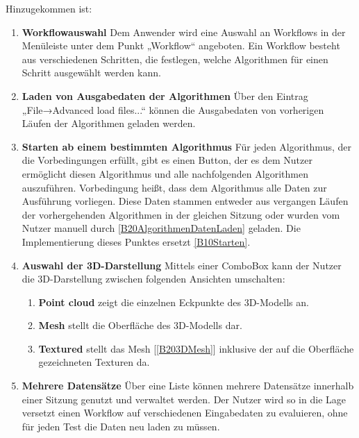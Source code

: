 Hinzugekommen ist:
\begin{enumerate}[ align=left, label={\textbf{\textbackslash B20\arabic*0\textbackslash}}]
	\item \textbf{Workflowauswahl} Dem Anwender wird eine Auswahl an Workflows in der Menüleiste unter dem Punkt „Workflow“ angeboten. Ein Workflow besteht aus verschiedenen Schritten, die festlegen, welche Algorithmen für einen Schritt ausgewählt werden kann.
	\item \textbf{Laden von Ausgabedaten der Algorithmen} \label{B20AlgorithmenDatenLaden} Über den Eintrag „File→Advanced load files...“ können die Ausgabedaten von vorherigen Läufen der Algorithmen geladen werden.
	\item \textbf{Starten ab einem bestimmten Algorithmus} Für jeden Algorithmus, der die Vorbedingungen erfüllt, gibt es einen Button, der es dem Nutzer ermöglicht diesen Algorithmus und alle nachfolgenden Algorithmen auszuführen. Vorbedingung heißt, dass dem Algorithmus alle Daten zur Ausführung vorliegen. Diese Daten stammen entweder aus vergangen Läufen der vorhergehenden Algorithmen in der gleichen Sitzung oder wurden vom Nutzer manuell durch \ref{B20AlgorithmenDatenLaden} geladen. Die Implementierung dieses Punktes ersetzt \ref{B10Starten}.
	\item \textbf{Auswahl der 3D-Darstellung} Mittels einer ComboBox kann der Nutzer die 3D-Darstellung zwischen folgenden Ansichten umschalten:
		\begin{enumerate}[ label={\textbf{\alph*}}, ref={\textbf{\textbackslash B20\arabic{enumi}0\textbackslash\alph*}} ]
			\item \textbf{Point cloud} zeigt die einzelnen Eckpunkte des 3D-Modells an.
			\item \textbf{Mesh} \label{B203DMesh} stellt die Oberfläche des 3D-Modells dar.
			\item \textbf{Textured} stellt das Mesh [\ref{B203DMesh}] inklusive der auf die Oberfläche gezeichneten Texturen da.
		\end{enumerate}
	\item \textbf{Mehrere Datensätze} Über eine Liste können mehrere Datensätze innerhalb einer Sitzung genutzt und verwaltet werden. Der Nutzer wird so in die Lage versetzt einen Workflow auf verschiedenen Eingabedaten zu evaluieren, ohne für jeden Test die Daten neu laden zu müssen.
\end{enumerate}